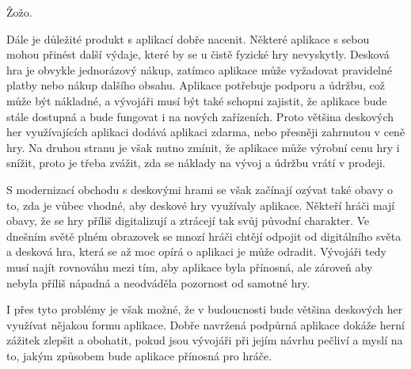 Žožo.

Dále je důležité produkt s aplikací dobře nacenit. Některé aplikace s sebou mohou přinést další výdaje, které by se u čistě fyzické hry nevyskytly. Desková hra je obvykle jednorázový nákup, zatímco aplikace může vyžadovat pravidelné platby nebo nákup dalšího obsahu. Aplikace potřebuje podporu a údržbu, což může být nákladné, a vývojáři musí být také schopni zajistit, že aplikace bude stále dostupná a bude fungovat i na nových zařízeních. Proto většina deskových her využívajících aplikaci dodává aplikaci zdarma, nebo přesněji zahrnutou v ceně hry. Na druhou stranu je však nutno zmínit, že aplikace může výrobní cenu hry i snížit, proto je třeba zvážit, zda se náklady na vývoj a údržbu vrátí v prodeji.

S modernizací obchodu s deskovými hrami se však začínají ozývat také obavy o to, zda je vůbec vhodné, aby deskové hry využívaly aplikace. Někteří hráči mají obavy, že se hry příliš digitalizují a ztrácejí tak svůj původní charakter. Ve dnešním světě plném obrazovek se mnozí hráči chtějí odpojit od digitálního světa a desková hra, která se až moc opírá o aplikaci je může odradit. Vývojáři tedy musí najít rovnováhu mezi tím, aby aplikace byla přínosná, ale zároveň aby nebyla příliš nápadná a neodváděla pozornost od samotné hry.

I přes tyto problémy je však možné, že v budoucnosti bude většina deskových her využívat nějakou formu aplikace. Dobře navržená podpůrná aplikace dokáže herní zážitek zlepšit a obohatit, pokud jsou vývojáři při jejím návrhu pečliví a myslí na to, jakým způsobem bude aplikace přínosná pro hráče.